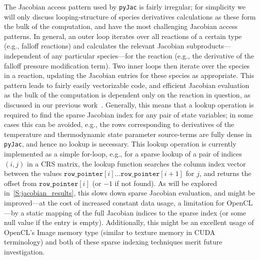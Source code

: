 \documentclass[12pt,number,sort&compress,preprint]{elsarticle}
\begin{document}
The Jacobian access pattern used by \texttt{pyJac} is fairly irregular; for simplicity we will only discuss looping-structure of species derivatives calculations as these form the bulk of the computation, and have the most challenging Jacobian access patterns.
In general, an outer loop iterates over all reactions of a certain type (e.g., falloff reactions) and calculates the relevant Jacobian subproducts---independent of any particular species---for the reaction (e.g., the derivative of the falloff pressure modification term).
Two inner loops then iterate over the species in a reaction, updating the Jacobian entries for these species as appropriate.
This pattern leads to fairly easily vectorizable code, and efficient Jacobian evaluation as the bulk of the computation is dependent only on the reaction in question, as discussed in our previous work~\cite{Niemeyer:2016aa}.
Generally, this means that a lookup operation is required to find the sparse Jacobian index for any pair of state variables; in some cases this can be avoided, e.g., the rows corresponding to derivatives of the temperature and thermodynamic state parameter source-terms are fully dense in \texttt{pyJac}, and hence no lookup is necessary.
This lookup operation is currently implemented as a simple for-loop, e.g., for a sparse lookup of a pair of indices $(i, j)$ in a CRS matrix, the lookup function searches the column index vector between the values $\texttt{row\_pointer}[i] \ldots \texttt{row\_pointer}[i + 1]$ for $j$, and returns the offset from $\texttt{row\_pointer}[i]$ (or $\num{-1}$ if not found).
As will be explored in~\cref{S:jacobian_results}, this slows down sparse Jacobian evaluation, and might be improved---at the cost of increased constant data usage, a limitation for OpenCL---by a static mapping of the full Jacobian indices to the sparse index (or some null value if the entry is empty).
Additionally, this might be an excellent usage of OpenCL's Image memory type (similar to texture memory in CUDA terminology) and both of these sparse indexing techniques merit future investigation.
\end{document}
